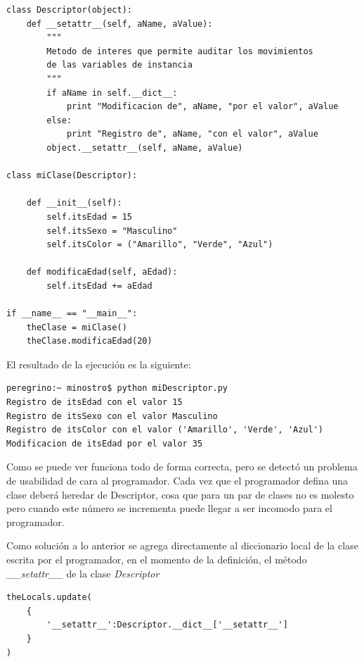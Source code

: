 \documentclass[12pt,legalpaper]{report}
\begin{document}
\begin{singlespace}
\begin{lstlisting}[style=Python]
class Descriptor(object):
    def __setattr__(self, aName, aValue):
        """
        Metodo de interes que permite auditar los movimientos
        de las variables de instancia
        """
        if aName in self.__dict__:
            print "Modificacion de", aName, "por el valor", aValue
        else:
            print "Registro de", aName, "con el valor", aValue
        object.__setattr__(self, aName, aValue)

class miClase(Descriptor):
    
    def __init__(self):
        self.itsEdad = 15
        self.itsSexo = "Masculino"
        self.itsColor = ("Amarillo", "Verde", "Azul")
    
    def modificaEdad(self, aEdad):
        self.itsEdad += aEdad

if __name__ == "__main__":
    theClase = miClase()
    theClase.modificaEdad(20)
\end{lstlisting}
\end{singlespace}

El resultado de la ejecución es la siguiente:

\begin{singlespace}
\begin{lstlisting}[style=consola,numbers=none]
peregrino:~ minostro$ python miDescriptor.py
Registro de itsEdad con el valor 15
Registro de itsSexo con el valor Masculino
Registro de itsColor con el valor ('Amarillo', 'Verde', 'Azul')
Modificacion de itsEdad por el valor 35
\end{lstlisting}
\end{singlespace}

Como se puede ver funciona todo de forma correcta, pero se detectó un problema de usabilidad de cara al programador.  Cada vez que el programador defina una clase deberá heredar de Descriptor, cosa que para un par de clases no es molesto pero cuando este número se incrementa puede llegar a ser incomodo para el programador.

Como solución a lo anterior se agrega directamente al diccionario local de la clase escrita por el programador, en el momento de la definición, el método \textit{\_\_setattr\_\_} de la clase \textit{Descriptor}

\begin{singlespace}
\begin{lstlisting}[style=consola,numbers=none]
theLocals.update(
    {
        '__setattr__':Descriptor.__dict__['__setattr__']
    }
)
\end{lstlisting}
\end{singlespace}
\end{document}

